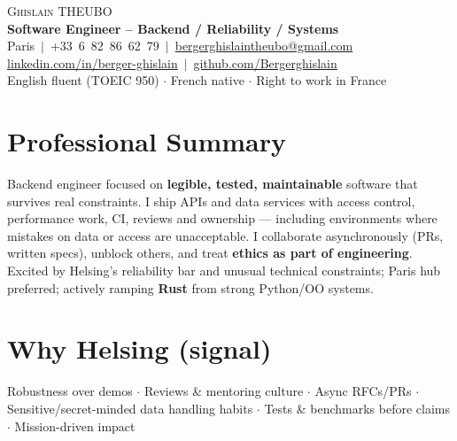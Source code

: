 \documentclass[letterpaper,10.5pt]{article}
\begin{document}
\begin{center}
{\Huge \scshape Ghislain THEUBO}\\[2pt]
\textbf{Software Engineer -- Backend / Reliability / Systems}\\[2pt]
\small Paris $\,|\,$ +33~6~82~86~62~79 $\,|\,$ \href{mailto:bergerghislaintheubo@gmail.com}{bergerghislaintheubo@gmail.com}\\[1pt]
\href{https://www.linkedin.com/in/berger-ghislain}{linkedin.com/in/berger-ghislain} $\,|\,$ \href{https://github.com/Bergerghislain}{github.com/Bergerghislain}\\[1pt]
\small English fluent (TOEIC 950) $\cdot$ French native $\cdot$ Right to work in France
\end{center}

\section{Professional Summary}
\small{
Backend engineer focused on \textbf{legible, tested, maintainable} software that survives real constraints.
I ship APIs and data services with access control, performance work, CI, reviews and ownership --- including
environments where mistakes on data or access are unacceptable. I collaborate asynchronously (PRs, written
specs), unblock others, and treat \textbf{ethics as part of engineering}. Excited by Helsing's reliability bar
and unusual technical constraints; Paris hub preferred; actively ramping \textbf{Rust} from strong Python/OO systems.
}

\section{Why Helsing (signal)}
\small{
Robustness over demos $\cdot$ Reviews \& mentoring culture $\cdot$ Async RFCs/PRs $\cdot$
Sensitive/secret-minded data handling habits $\cdot$ Tests \& benchmarks before claims $\cdot$ Mission-driven impact
}
\end{document}
